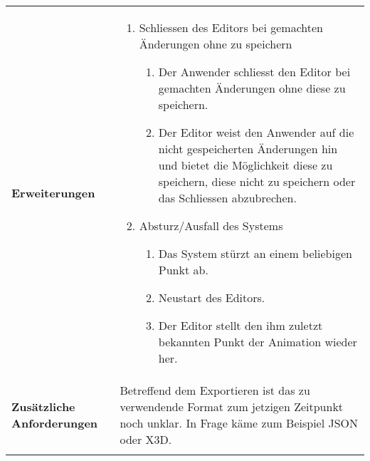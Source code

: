 \begin{longtabu}{p{0.5\textwidth}p{0.5\textwidth}}
    \cmidrule(r){1-1}\cmidrule(lr){2-2}
        \textbf{Erweiterungen} &
        \begin{enumerate}[label= (\alph*)]
            \item{Schliessen des Editors bei gemachten Änderungen ohne zu
                    speichern
                \begin{enumerate}[label= (\roman*)]
                    \item{Der Anwender schliesst den Editor bei gemachten
                            Änderungen ohne diese zu speichern.}
                    \item{Der Editor weist den Anwender auf die
                            nicht gespeicherten Änderungen hin und bietet
                            die Möglichkeit diese zu speichern, diese nicht
                            zu speichern oder das Schliessen abzubrechen.}
                \end{enumerate}
            }
            \item{Absturz/Ausfall des Systems
                \begin{enumerate}[label= (\roman*)]
                        \item{Das System stürzt an einem beliebigen Punkt
                                ab.}
                        \item{Neustart des Editors.}
                        \item{Der Editor stellt den ihm zuletzt bekannten
                                Punkt der Animation wieder her.}
                \end{enumerate}
            }
        \end{enumerate}
        \\
    \cmidrule(r){1-1}\cmidrule(lr){2-2}
        \textbf{Zusätzliche Anforderungen} &
        Betreffend dem Exportieren ist das zu verwendende Format zum jetzigen
        Zeitpunkt noch unklar. In Frage käme zum Beispiel
        JSON\protect\footnotemark{} oder X3D\protect\footnotemark{}.\\
    \bottomrule
\end{longtabu}
